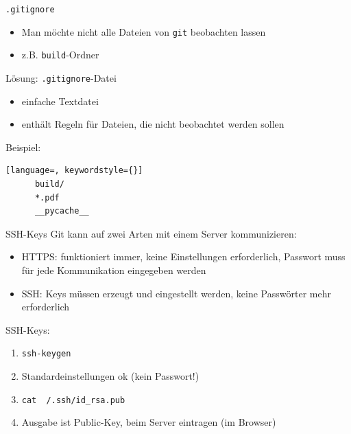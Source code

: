 \begin{frame}[fragile]{\texttt{.gitignore}}
    \begin{itemize}
    \item Man möchte nicht alle Dateien von \texttt{git} beobachten lassen
    \item z.B. \texttt{build}-Ordner
    \end{itemize}
    \begin{center}
        \Large\textcolor{TUgreen}{Lösung:} \texttt{.gitignore}-Datei
    \end{center}

    \begin{itemize}
    \item einfache Textdatei
    \item enthält Regeln für Dateien, die nicht beobachtet werden sollen
    \end{itemize}
    Beispiel:
    \vspace{1em}
    \begin{lstlisting}[language=, keywordstyle={}]
      build/
      *.pdf
      __pycache__
    \end{lstlisting}
\end{frame}

\begin{frame}{SSH-Keys}
  Git kann auf zwei Arten mit einem Server kommunizieren:
  \begin{itemize}
    \item HTTPS: funktioniert immer, keine Einstellungen erforderlich, Passwort muss für jede Kommunikation eingegeben werden
    \item SSH: Keys müssen erzeugt und eingestellt werden, keine Passwörter mehr erforderlich
  \end{itemize}

  SSH-Keys:
  \begin{enumerate}
    \item \texttt{ssh-keygen}
    \item Standardeinstellungen ok (kein Passwort!)
    \item \texttt{cat ~/.ssh/id\_rsa.pub}
    \item Ausgabe ist Public-Key, beim Server eintragen (im Browser)
  \end{enumerate}
\end{frame}

